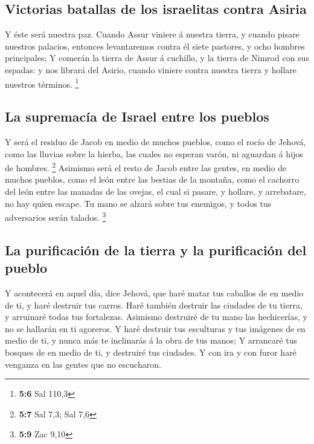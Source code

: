 \hypertarget{victorias-batallas-de-los-israelitas-contra-asiria}{%
\subsection{Victorias batallas de los israelitas contra
Asiria}\label{victorias-batallas-de-los-israelitas-contra-asiria}}

 Y éste será nuestra paz. Cuando Assur viniere á nuestra
tierra, y cuando pisare nuestros palacios, entonces levantaremos contra
él siete pastores, y ocho hombres principales;  Y comerán
la tierra de Assur á cuchillo, y la tierra de Nimrod con sus espadas: y
nos librará del Asirio, cuando viniere contra nuestra tierra y hollare
nuestros términos. \footnote{\textbf{5:6} Sal 110,3}

\hypertarget{la-supremacuxeda-de-israel-entre-los-pueblos}{%
\subsection{La supremacía de Israel entre los
pueblos}\label{la-supremacuxeda-de-israel-entre-los-pueblos}}

 Y será el residuo de Jacob en medio de muchos pueblos,
como el rocío de Jehová, como las lluvias sobre la hierba, las cuales no
esperan varón, ni aguardan á hijos de hombres. \footnote{\textbf{5:7}
  Sal 7,3; Sal 7,6}  Asimismo será el resto de Jacob entre
las gentes, en medio de muchos pueblos, como el león entre las bestias
de la montaña, como el cachorro del león entre las manadas de las
ovejas, el cual si pasare, y hollare, y arrebatare, no hay quien escape.
 Tu mano se alzará sobre tus enemigos, y todos tus
adversarios serán talados. \footnote{\textbf{5:9} Zac 9,10}

\hypertarget{la-purificaciuxf3n-de-la-tierra-y-la-purificaciuxf3n-del-pueblo}{%
\subsection{La purificación de la tierra y la purificación del
pueblo}\label{la-purificaciuxf3n-de-la-tierra-y-la-purificaciuxf3n-del-pueblo}}

 Y acontecerá en aquel día, dice Jehová, que haré matar
tus caballos de en medio de ti, y haré destruir tus carros.
 Haré también destruir las ciudades de tu tierra, y
arruinaré todas tus fortalezas.  Asimismo destruiré de tu
mano las hechicerías, y no se hallarán en ti agoreros.  Y
haré destruir tus esculturas y tus imágenes de en medio de ti, y nunca
más te inclinarás á la obra de tus manos;  Y arrancaré
tus bosques de en medio de ti, y destruiré tus ciudades. 
Y con ira y con furor haré venganza en las gentes que no escucharon.


